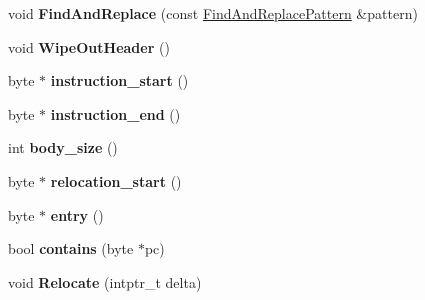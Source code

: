 \begin{DoxyCompactItemize}
\item 
void {\bfseries Find\+And\+Replace} (const \hyperlink{classv8_1_1internal_1_1_code_1_1_find_and_replace_pattern}{Find\+And\+Replace\+Pattern} \&pattern)\hypertarget{classv8_1_1internal_1_1_code_abb8cdd75f4e13a6cb8ffbe940253a5cc}{}\label{classv8_1_1internal_1_1_code_abb8cdd75f4e13a6cb8ffbe940253a5cc}

\item 
void {\bfseries Wipe\+Out\+Header} ()\hypertarget{classv8_1_1internal_1_1_code_adb5e049c29724f76c81113f3f2f7ec85}{}\label{classv8_1_1internal_1_1_code_adb5e049c29724f76c81113f3f2f7ec85}

\item 
byte $\ast$ {\bfseries instruction\+\_\+start} ()\hypertarget{classv8_1_1internal_1_1_code_ab6c25848a714426ab9ed8f7501e89cb2}{}\label{classv8_1_1internal_1_1_code_ab6c25848a714426ab9ed8f7501e89cb2}

\item 
byte $\ast$ {\bfseries instruction\+\_\+end} ()\hypertarget{classv8_1_1internal_1_1_code_a98f72bddd264e2f7645594a73fe374ff}{}\label{classv8_1_1internal_1_1_code_a98f72bddd264e2f7645594a73fe374ff}

\item 
int {\bfseries body\+\_\+size} ()\hypertarget{classv8_1_1internal_1_1_code_a8f2cd5232c81c51dad77870371197dcc}{}\label{classv8_1_1internal_1_1_code_a8f2cd5232c81c51dad77870371197dcc}

\item 
byte $\ast$ {\bfseries relocation\+\_\+start} ()\hypertarget{classv8_1_1internal_1_1_code_a6ac75555a8bf3ce9abd409244fc4b0d7}{}\label{classv8_1_1internal_1_1_code_a6ac75555a8bf3ce9abd409244fc4b0d7}

\item 
byte $\ast$ {\bfseries entry} ()\hypertarget{classv8_1_1internal_1_1_code_a18ae4b2fd404251b3c24de0a7e138c9f}{}\label{classv8_1_1internal_1_1_code_a18ae4b2fd404251b3c24de0a7e138c9f}

\item 
bool {\bfseries contains} (byte $\ast$pc)\hypertarget{classv8_1_1internal_1_1_code_aa3507b7581c11299214b4ab69704db76}{}\label{classv8_1_1internal_1_1_code_aa3507b7581c11299214b4ab69704db76}

\item 
void {\bfseries Relocate} (intptr\+\_\+t delta)\hypertarget{classv8_1_1internal_1_1_code_a1e871f321b98ede8b77db33826a2b1c1}{}\label{classv8_1_1internal_1_1_code_a1e871f321b98ede8b77db33826a2b1c1}


\end{DoxyCompactItemize}
